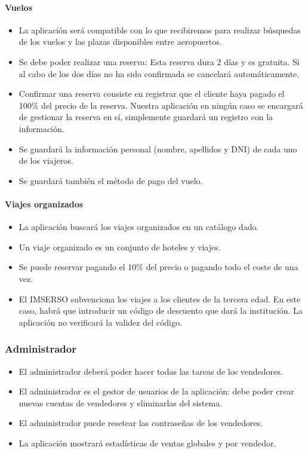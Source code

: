 \documentclass[12pt,a4paper,titlepage]{article}
\begin{document}
\paragraph{Vuelos}

\begin{itemize}
\item La aplicación será compatible con lo que recibiremos para realizar búsquedas de los vuelos y las plazas disponibles entre aeropuertos.
\item Se debe poder realizar una reserva: Esta reserva dura 2 días y es gratuita. Si al cabo de los dos días no ha sido confirmada se cancelará automáticamente.
\item Confirmar una reserva consiste en registrar que el cliente haya pagado el 100\% del precio de la reserva. Nuestra aplicación en ningún caso se encargará de gestionar la reserva en sí, simplemente guardará un registro con la información.
\item Se guardará la información personal (nombre, apellidos y DNI) de cada uno de los viajeros.
\item Se guardará también el método de pago del vuelo.
\end{itemize}

\paragraph{Viajes organizados}
\begin{itemize}
\item La aplicación buscará los viajes organizados en un catálogo dado.
\item Un viaje organizado es un conjunto de hoteles y viajes.
\item Se puede reservar pagando el 10\% del precio o pagando todo el coste de una vez.
\item El IMSERSO subvenciona los viajes a los clientes de la tercera edad. En este caso, habrá que introducir un código de descuento que dará la institución. La aplicación no verificará la validez del código.

\end{itemize}

\subsubsection{Administrador}

\begin{itemize}
\item El administrador deberá poder hacer todas las tareas de los vendedores.
\item El administrador es el gestor de usuarios de la aplicación: debe poder crear nuevas cuentas de vendedores y eliminarlas del sistema.
\item El administrador puede resetear las contraseñas de los vendedores.
\item La aplicación mostrará estadísticas de ventas globales y por vendedor.
\end{itemize}  
  
\end{document}

